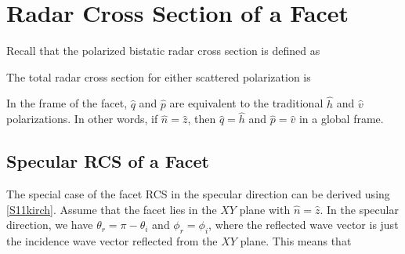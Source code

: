 %

\section{Radar Cross Section of a Facet}


Recall that the polarized bistatic radar cross section is defined as

The total radar cross section for either scattered polarization is 

In the frame of the facet, $\hat{q}$ and $\hat{p}$ are equivalent to the traditional $\hat{h}$ and $\hat{v}$ polarizations.  In other words, if $\hat{n} = \hat{z}$, then $\hat{q}=\hat{h}$ and $\hat{p} = \hat{v}$ in a global frame.


\subsection{Specular RCS of a Facet}

The special case of the facet RCS in the specular direction can be derived using \eqref{S11kirch}.  Assume that the facet lies in the $XY$ plane with $\hat{n} = \hat{z}$. In the specular direction, we have $\theta_r = \pi - \theta_i$ and $\phi_r = \phi_i$, where the reflected wave vector is just the incidence wave vector reflected from the $XY$ plane. This means that

